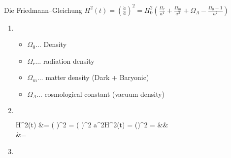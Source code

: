 \documentclass{alex_hü}
\begin{document}
\renewcommand{\labelenumi}{\alph{enumi})}


\begin{mybox}{Die Friedmann–Gleichung}
	\centering \( H^2(t) = \left( \tfrac{\dot{a}}{a} \right)^2 = H_0^2\left( \tfrac{\Omega_r}{a^4} + \tfrac{\Omega_m}{a^3} + \Omega_\Lambda - \tfrac{\Omega_0 - 1}{a^2} \right) \)
	\tcblower
	\begin{enumerate}
		\item 
		\begin{itemize}
			\item \( \Omega_0 \dots \) Density 
			\item \( \Omega_r \dots \) radiation density
			\item \( \Omega_m \dots \) matter density (Dark + Baryonic)
			\item \( \Omega_\Lambda \dots \) cosmological constant (vacuum density)
		\end{itemize}
	\tcbline
		\item \(  \)
		\begin{flalign*}
			H^2(t) &= \left(  \right)^2
				= \left(  \right)^2 
				\quad\Rightarrow\quad a^2H^2(t) = \left(\right)^2
				\quad\Rightarrow\quad {} =  &&\\
			 &= 
		\end{flalign*}
	\tcbline
		\item \(  \)
%			
	\end{enumerate}
\end{mybox}
\end{document}
